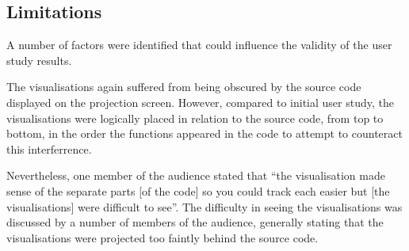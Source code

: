 





\subsection{Limitations}

A number of factors were identified that could influence the validity of the user study results.

The visualisations again suffered from being obscured by the source code displayed on the projection screen. However, compared to initial user study, the visualisations were logically placed in relation to the source code, from top to bottom, in the order the functions appeared in the code to attempt to counteract this interferrence.

Nevertheless, one member of the audience stated that ``the visualisation made sense of the separate parts [of the code] so you could track each easier but [the visualisations] were difficult to see''. The difficulty in seeing the visualisations was discussed by a number of members of the audience, generally stating that the visualisations were projected too faintly behind the source code.

